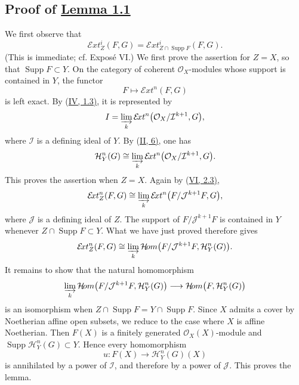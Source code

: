 \documentclass[11pt,a4paper,oneside]{book}
\providecommand{\SheafH}{\mathcal H}
\providecommand{\SheafHom}{\mathcal H\!om}
\providecommand{\SheafExt}{\mathcal E\!xt}
\providecommand{\OX}{\mathcal O_X}
\providecommand{\Supp}{\operatorname{Supp}}
\theoremstyle{plain}
\theoremstyle{definition}
\theoremstyle{remark}
\begin{document}
\subsection*{Proof of \hyperref[VII.1.1]{Lemma 1.1}}

We first observe that
\[
  \SheafExt_Z^i(F,G)
  =\SheafExt_{Z\cap\Supp F}^i(F,G).
\]
(This is immediate; cf. Expos\'e VI.) We first prove the assertion for
$Z=X$, so that $\Supp F\subset Y$. On the category of coherent $\OX$-modules
whose support is contained in $Y$, the functor
\[
  F\longmapsto\SheafExt^n(F,G)
\]
is left exact. By (\hyperref[IV.1.3]{IV, 1.3)}, it is represented by
\[
  I=\varinjlim_k\SheafExt^n
    \bigl(\OX/\mathcal I^{k+1},G\bigr),
\]
where $\mathcal I$ is a defining ideal of $Y$. By (\hyperref[II.6]{II, 6)}, one has
\[
  \SheafH_Y^n(G)\cong
  \varinjlim_k\SheafExt^n
    \bigl(\OX/\mathcal I^{k+1},G\bigr).
\]
This proves the assertion when $Z=X$. Again by (\hyperref[VI.2.3]{VI, 2.3)},
\[
  \SheafExt_Z^n(F,G)\cong
  \varinjlim_k\SheafExt^n
    \bigl(F/\mathcal J^{k+1}F,G\bigr),
\]
where $\mathcal J$ is a defining ideal of $Z$. The support of
$F/\mathcal J^{k+1}F$ is contained in $Y$ whenever
$Z\cap\Supp F\subset Y$. What we have just proved therefore gives
\[
  \SheafExt_Z^n(F,G)\cong
  \varinjlim_k\SheafHom
    \bigl(F/\mathcal J^{k+1}F,\SheafH_Y^n(G)\bigr).
\]
It remains to show that the natural homomorphism
\[
  \varinjlim_k\SheafHom
    \bigl(F/\mathcal J^{k+1}F,\SheafH_Y^n(G)\bigr)
  \longrightarrow
  \SheafHom\bigl(F,\SheafH_Y^n(G)\bigr)
\]
is an isomorphism when $Z\cap\Supp F=Y\cap\Supp F$. Since $X$ admits a cover by
Noetherian affine open subsets, we reduce to the case where $X$ is affine
Noetherian. Then $F(X)$ is a finitely generated $\OX(X)$-module and
$\Supp\SheafH_Y^n(G)\subset Y$. Hence every homomorphism
\[
  u:F(X)\longrightarrow\SheafH_Y^n(G)(X)
\]
is annihilated by a power of $\mathcal I$, and therefore by a power of
$\mathcal J$. This proves the lemma.
\end{document}
